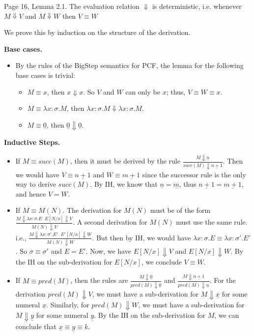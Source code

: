 \begin{problem}{Page 16, Lemma 2.1.}
    The evaluation relation $\Downarrow$ is deterministic, i.e. whenever $M \Downarrow V$ and $M \Downarrow W$ then $V \equiv W$
\end{problem}

\begin{solution}
        We prove this by induction on the structure of the derivation.

    \textbf{Base cases.}
    \begin{itemize}
        \item By the rules of the BigStep semantics for PCF, the lemma for the following base cases is trivial:
            \begin{itemize}
                \item $M \equiv x$, then $x \Downarrow x$. So $V$ and $W$ can only be $x$; thus, $V \equiv W \equiv x$.
                \item $M \equiv \lambda x:\sigma.M$, then $\lambda x:\sigma.M \Downarrow \lambda x:\sigma.M$.
                \item $M \equiv \underline{0}$, then $\underline{0} \Downarrow \underline{0}$.
            \end{itemize}
    \end{itemize}
    \textbf{Inductive Steps.}
    \begin{itemize}
        \item If $M \equiv succ(M)$, then it must be derived by the rule $\frac{M \Downarrow \underline{n}}{succ(M) \Downarrow \underline{n+1}}$.
              Then we would have $V \equiv \underline{n+1}$ and $W \equiv \underline{m+1}$ since the successor rule is the only way to derive $succ(M)$.
              By IH, we know that $\underline{n} = \underline{m}$, thus $\underline{n+1} = \underline{m+1}$, and hence $V = W$.
        
        \item If $M \equiv M(N)$. The derivation for $M(N)$ must be of the form $\frac{M \Downarrow \lambda x:\sigma.E \;\; E[N/x] \Downarrow V}{M(N) \Downarrow V}$.
              A second derivation for $M(N)$ must use the same rule. i.e., $\frac{M \Downarrow \lambda x:\sigma'.E' \;\; E'[N/x] \Downarrow W}{M(N) \Downarrow W}$.
              But then by IH, we would have $\lambda x:\sigma.E \equiv \lambda x:\sigma'.E'$. So $\sigma \equiv \sigma'$ and $E = E'$. Now, we have $E[N/x] \Downarrow V$ and $E[N/x] \Downarrow W$.
              By the IH on the sub-derivation for $E[N/x]$, we conclude $V \equiv W$.
        \item If $M \equiv pred(M)$, then the rules are $\frac{M \Downarrow \underline{0}}{pred(M) \Downarrow \underline{0}}$ and $\frac{M \Downarrow \underline{n+1}}{pred(M) \Downarrow \underline{n}}$.
              For the derivation $pred(M) \Downarrow V$, we must have a sub-derivation for $M \Downarrow \underline{x}$ for some numeral $\underline{x}$.
              Similarly, for $pred(M) \Downarrow W$, we must have a sub-derivation for $M \Downarrow \underline{y}$ for some numeral $\underline{y}$. 
              By the IH on the sub-derivation for $M$, we can conclude that $\underline{x} \equiv \underline{y} \equiv k$.
              

\end{itemize}
\end{solution}
